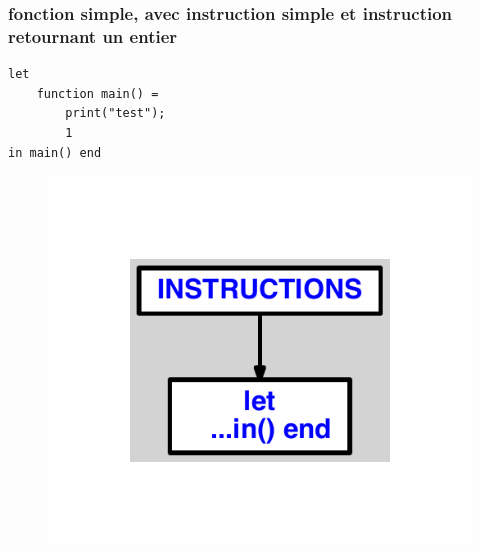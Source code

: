\documentclass{article}
\begin{document}
\subsubsection{fonction simple, avec instruction simple et instruction retournant un entier}
\begin{lstlisting}
let
	function main() =
		print("test");
		1
in main() end
\end{lstlisting}
\newpage
\begin{figure}[H]
\centering
\includegraphics[max width=\textwidth]{ast/ast_232.pdf}
\end{figure}
\newpage
\end{document}
